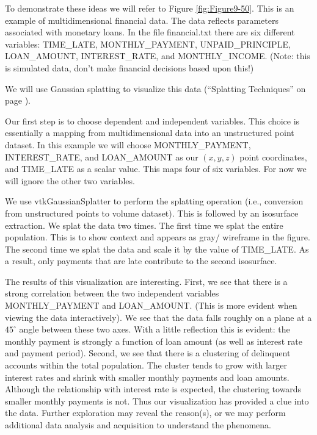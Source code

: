 To demonstrate these ideas we will refer to Figure \ref{fig:Figure9-50}. This is an example of multidimensional financial data. The data reflects parameters associated with monetary loans. In the file financial.txt there are six different variables: TIME\_LATE, MONTHLY\_PAYMENT, UNPAID\_PRINCIPLE, LOAN\_AMOUNT, INTEREST\_RATE, and MONTHLY\_INCOME. (Note: this is simulated data, don't make financial decisions based upon this!)

We will use Gaussian splatting to visualize this data (``Splatting Techniques'' on page \pageref{subsec:visualizing_unstructured_points_splatting_techniques}).

Our first step is to choose dependent and independent variables. This choice is essentially a mapping from multidimensional data into an unstructured point dataset. In this example we will choose MONTHLY\_PAYMENT, INTEREST\_RATE, and LOAN\_AMOUNT as our $(x, y, z)$ point coordinates, and TIME\_LATE as a scalar value. This maps four of six variables. For now we will ignore the other two variables.

We use vtkGaussianSplatter to perform the splatting operation (i.e., conversion from unstructured points to volume dataset). This is followed by an isosurface extraction. We splat the data two times. The first time we splat the entire population. This is to show context and appears as gray/ wireframe in the figure. The second time we splat the data and scale it by the value of TIME\_LATE. As a result, only payments that are late contribute to the second isosurface.

The results of this visualization are interesting. First, we see that there is a strong correlation between the two independent variables MONTHLY\_PAYMENT and LOAN\_AMOUNT. (This is more evident when viewing the data interactively). We see that the data falls roughly on a plane at a $45^\circ$ angle between these two axes. With a little reflection this is evident: the monthly payment is strongly a function of loan amount (as well as interest rate and payment period). Second, we see that there is a clustering of delinquent accounts within the total population. The cluster tends to grow with larger interest rates and shrink with smaller monthly payments and loan amounts. Although the relationship with interest rate is expected, the clustering towards smaller monthly payments is not. Thus our visualization has provided a clue into the data. Further exploration may reveal the reason(s), or we may perform additional data analysis and acquisition to understand the phenomena.

